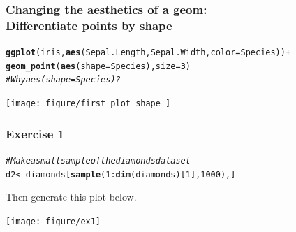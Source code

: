 \documentclass{beamer}\usepackage[]{graphicx}\usepackage[]{color}
\makeatletter
\newcommand{\hlnum}[1]{\textcolor[rgb]{0.686,0.059,0.569}{#1}}%
\newcommand{\hlcom}[1]{\textcolor[rgb]{0.678,0.584,0.686}{\textit{#1}}}%
\newcommand{\hlopt}[1]{\textcolor[rgb]{0,0,0}{#1}}%
\newcommand{\hlstd}[1]{\textcolor[rgb]{0.345,0.345,0.345}{#1}}%
\newcommand{\hlkwb}[1]{\textcolor[rgb]{0.69,0.353,0.396}{#1}}%
\newcommand{\hlkwc}[1]{\textcolor[rgb]{0.333,0.667,0.333}{#1}}%
\newcommand{\hlkwd}[1]{\textcolor[rgb]{0.737,0.353,0.396}{\textbf{#1}}}%
\newenvironment{kframe}{%
 \def\at@end@of@kframe{}%
 \ifinner\ifhmode%
  \def\at@end@of@kframe{\end{minipage}}%
  \begin{minipage}{\columnwidth}%
 \fi\fi%
 \def\FrameCommand##1{\hskip\@totalleftmargin \hskip-\fboxsep
 \colorbox{shadecolor}{##1}\hskip-\fboxsep
     \hskip-\linewidth \hskip-\@totalleftmargin \hskip\columnwidth}%
 \MakeFramed {\advance\hsize-\width
   \@totalleftmargin\z@ \linewidth\hsize
   \@setminipage}}%
 {\par\unskip\endMakeFramed%
 \at@end@of@kframe}
\newenvironment{knitrout}{}{} %
\makeatother
\begin{document}
\begin{frame}[fragile]
\frametitle{Changing the aesthetics of a geom: \\Differentiate points by shape}
\begin{knitrout}\footnotesize
{}\color{fgcolor}\begin{kframe}
\begin{alltt}
\hlkwd{ggplot}\hlstd{(iris,} \hlkwd{aes}\hlstd{(Sepal.Length, Sepal.Width,} \hlkwc{color} \hlstd{= Species))} \hlopt{+}
\hlkwd{geom_point}\hlstd{(}\hlkwd{aes}\hlstd{(}\hlkwc{shape} \hlstd{= Species),} \hlkwc{size} \hlstd{=} \hlnum{3}\hlstd{)}
\hlcom{# Why aes(shape = Species)?}
\end{alltt}
\end{kframe}

{\centering \texttt{[image: figure/first\_plot\_shape\_]} 

}



\end{knitrout}
\end{frame}


\begin{frame}[fragile]
\frametitle{Exercise 1}
\begin{knitrout}\footnotesize
{}\color{fgcolor}\begin{kframe}
\begin{alltt}
\hlcom{# Make a small sample of the diamonds dataset}
\hlstd{d2} \hlkwb{<-} \hlstd{diamonds[}\hlkwd{sample}\hlstd{(}\hlnum{1}\hlopt{:}\hlkwd{dim}\hlstd{(diamonds)[}\hlnum{1}\hlstd{],} \hlnum{1000}\hlstd{), ]}
\end{alltt}
\end{kframe}
\end{knitrout}
Then generate this plot below.

\begin{knitrout}\footnotesize
{}\color{fgcolor}

{\centering \texttt{[image: figure/ex1]} 

}



\end{knitrout}
\end{frame}

\end{document}
